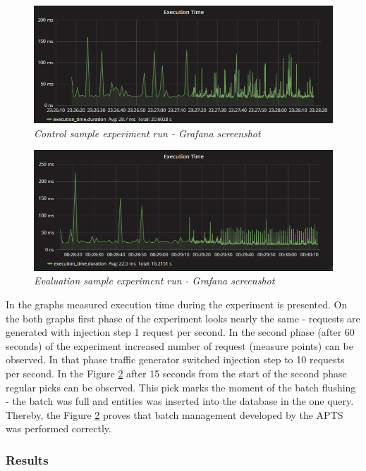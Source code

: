 \documentclass[12pt,a4paper]{article}
\begin{document}
\begin{figure}[!htb]
\centering
\includegraphics[width=1\textwidth]{batchCtrl}
\caption{\textit{Control sample experiment run - Grafana screenshot}} \label{batchevaluationscreencontrol}
\end{figure}
\begin{figure}[!htb]
\centering
\includegraphics[width=1\textwidth]{batchEval}
\caption{\textit{Evaluation sample experiment run - Grafana screenshot}} \label{batchevaluationscreenevaluation}
\end{figure}

In the graphs measured execution time during the experiment is presented. On the both graphs first phase of the experiment looks nearly the same - requests are generated with injection step 1 request per second. In the second phase (after 60 seconds) of the experiment increased number of request (measure points) can be observed. In that phase traffic generator switched injection step to 10 requests per second. In the Figure \ref{batchevaluationscreenevaluation} after 15 seconds from the start of the second phase regular picks can be observed. This pick marks the moment of the batch flushing - the batch was full and entities was inserted into the database in the one query. Thereby, the Figure \ref{batchevaluationscreenevaluation} proves that batch management developed by the APTS was performed correctly. 

\subsubsection{Results} \label{section:batchresults}
\end{document}
